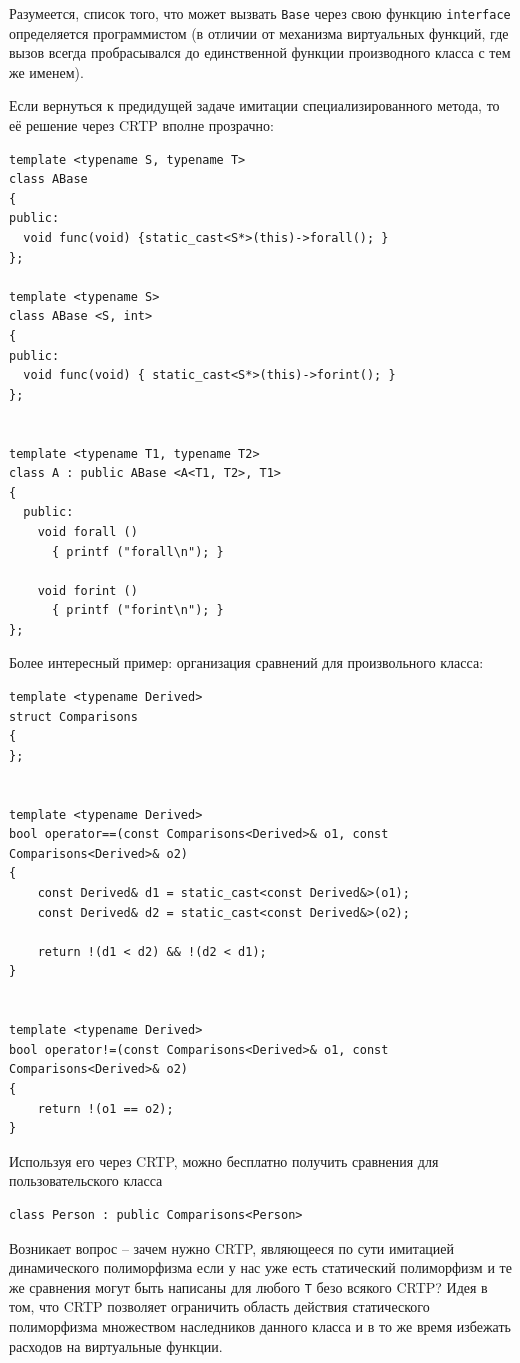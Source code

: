 \documentclass[a4paper,12pt,oneside]{article}
\begin{document}
Разумеется, список того, что может вызвать \lstinline!Base! через свою функцию \lstinline!interface! определяется программистом (в отличии от механизма виртуальных функций, где вызов всегда пробрасывался до единственной функции производного класса с тем же именем).

Если вернуться к предидущей задаче имитации специализированного метода, то её решение через CRTP вполне прозрачно:

\begin{lstlisting}
template <typename S, typename T>
class ABase
{
public:
  void func(void) {static_cast<S*>(this)->forall(); }
};

template <typename S>
class ABase <S, int>
{
public:
  void func(void) { static_cast<S*>(this)->forint(); }
};


template <typename T1, typename T2>
class A : public ABase <A<T1, T2>, T1>
{
  public:
    void forall ()
      { printf ("forall\n"); }

    void forint ()
      { printf ("forint\n"); }
};
\end{lstlisting}

Более интересный пример: организация сравнений для произвольного класса:

\begin{lstlisting}
template <typename Derived>
struct Comparisons
{
};


template <typename Derived>
bool operator==(const Comparisons<Derived>& o1, const Comparisons<Derived>& o2)
{
    const Derived& d1 = static_cast<const Derived&>(o1);
    const Derived& d2 = static_cast<const Derived&>(o2);

    return !(d1 < d2) && !(d2 < d1);
}


template <typename Derived>
bool operator!=(const Comparisons<Derived>& o1, const Comparisons<Derived>& o2)
{
    return !(o1 == o2);
}
\end{lstlisting}

Используя его через CRTP, можно бесплатно получить сравнения для пользовательского класса

\begin{lstlisting}
class Person : public Comparisons<Person>
\end{lstlisting}

Возникает вопрос -- зачем нужно CRTP, являющееся по сути имитацией динамического полиморфизма если у нас уже есть статический полиморфизм и те же сравнения могут быть написаны для любого \lstinline!T! безо всякого CRTP? Идея в том, что CRTP позволяет ограничить область действия статического полиморфизма множеством наследников данного класса и в то же время избежать расходов на виртуальные функции.
\end{document}
